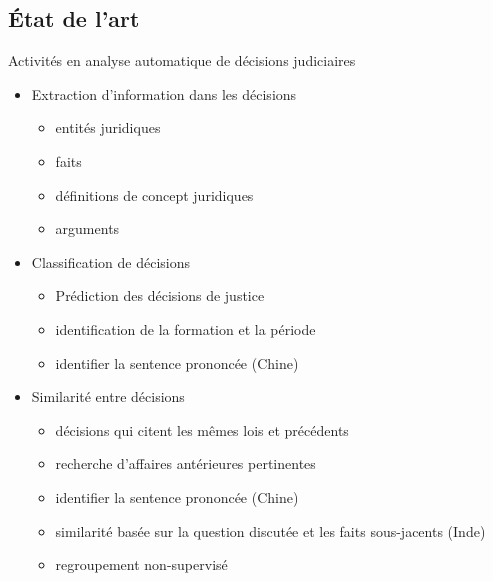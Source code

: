 \subsection{État de l'art}
\begin{frame}[c]{Activités en analyse automatique de décisions judiciaires}
	\scriptsize
	\begin{itemize}
		\item Extraction d'information dans les décisions
		\begin{itemize}  \scriptsize
			\item entités juridiques \cite{Waltl2016lexia, andrew2018legalNerAndRelation}
			\item faits \cite{wyner2010extractlegalelts, wyner2010casefactors, Shulayeva2017recognfactprincip}
			\item définitions de concept juridiques \cite{Waltl2016lexia,waltl2017legaliegerman}
			\item arguments \cite{moens2007NBvsMaxent4arguments}
		\end{itemize}
		\item Classification de décisions
		\begin{itemize} \scriptsize
			\item Prédiction des décisions de justice \cite{Ashley2009classifCases, Aletras2016predictDecisionECHR}
			\item identification de la formation et la période \cite{Sulea2017predictareadecision,sulea2017legalEnsSVM}
			\item identifier la sentence prononcée (Chine) \cite{ma2018wmdchinesecase}
		\end{itemize}
		\item Similarité entre décisions 
		\begin{itemize}  \scriptsize
			\item décisions qui citent les mêmes lois et précédents \cite{nair2018judgsimassorule}
			\item recherche d'affaires antérieures pertinentes  \cite{thenmozhi2017legalprecedretriev}
			\item identifier la sentence prononcée (Chine) \cite{ma2018wmdchinesecase}
			\item similarité basée sur la question discutée et les faits sous-jacents (Inde) \cite{kumar2011judgmentsimilarity}
			\item regroupement non-supervisé \cite{raghuveer2012legalclusteringLDA}
		\end{itemize}
	\end{itemize}
\end{frame}

